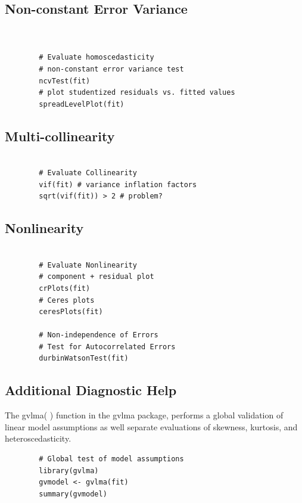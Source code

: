 \documentclass[main.tex]{subfiles}
\begin{document}
	\subsection*{Non-constant Error Variance}
	\begin{framed}
		\begin{verbatim}	
		
		
		# Evaluate homoscedasticity
		# non-constant error variance test
		ncvTest(fit)
		# plot studentized residuals vs. fitted values 
		spreadLevelPlot(fit)
		\end{verbatim}
	\end{framed}
	\subsection*{Multi-collinearity}
	\begin{framed}
		\begin{verbatim}
		
		# Evaluate Collinearity
		vif(fit) # variance inflation factors 
		sqrt(vif(fit)) > 2 # problem?
		\end{verbatim}
	\end{framed}
	\subsection{Nonlinearity}
	\begin{framed}
		\begin{verbatim}	
		
		# Evaluate Nonlinearity
		# component + residual plot 
		crPlots(fit)
		# Ceres plots 
		ceresPlots(fit)
		
		# Non-independence of Errors
		# Test for Autocorrelated Errors
		durbinWatsonTest(fit)
		\end{verbatim}
	\end{framed}
	\subsection{Additional Diagnostic Help}
	The gvlma( ) function in the gvlma package, performs a global validation of linear model assumptions as well separate evaluations of skewness, kurtosis, and heteroscedasticity.
	\begin{framed}
		\begin{verbatim}
		# Global test of model assumptions
		library(gvlma)
		gvmodel <- gvlma(fit) 
		summary(gvmodel)
		\end{verbatim}
	\end{framed}
	
\end{document}
